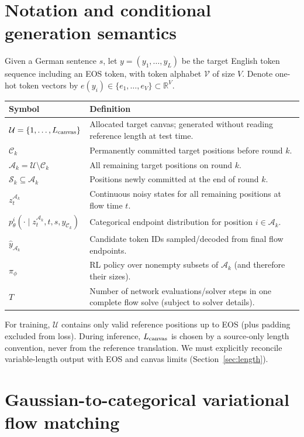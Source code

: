 \documentclass[11pt,a4paper]{article}
\newcommand{\C}{\mathcal C}
\newcommand{\A}{\mathcal A}
\newcommand{\Sset}{\mathcal S}
\newcommand{\V}{\mathcal V}
\begin{document}
\section{Notation and conditional generation semantics}
Given a German sentence $s$, let $y=(y_1,\ldots,y_L)$ be the target English token sequence including an EOS token, with token alphabet $\V$ of size $V$. Denote one-hot token vectors by $e(y_i)\in\{e_1,\ldots,e_V\}\subset\mathbb R^V$.
\begin{center}
\begin{tabularx}{\linewidth}{@{}lX@{}}\toprule
Symbol & Definition \\ \midrule
$\mathcal U=\{1,\dots,L_{\rm canvas}\}$ & Allocated target canvas; generated without reading reference length at test time. \\
$\C_k$ & Permanently committed target positions before round $k$. \\
$\A_k=\mathcal U\setminus\C_k$ & All remaining target positions on round $k$. \\
$\Sset_k\subseteq\A_k$ & Positions newly committed at the end of round $k$. \\
$z_t^{\A_k}$ & Continuous noisy states for all remaining positions at flow time $t$. \\
$p_\theta^i(\cdot\mid z_t^{\A_k},t,s,y_{\C_k})$ & Categorical endpoint distribution for position $i\in\A_k$. \\
$\widehat y_{\A_k}$ & Candidate token IDs sampled/decoded from final flow endpoints. \\
$\pi_\phi$ & RL policy over nonempty subsets of $\A_k$ (and therefore their sizes). \\
$T$ & Number of network evaluations/solver steps in one complete flow solve (subject to solver details). \\
\bottomrule
\end{tabularx}
\end{center}
For training, $\mathcal U$ contains only valid reference positions up to EOS (plus padding excluded from loss). During inference, $L_{\rm canvas}$ is chosen by a source-only length convention, never from the reference translation. We must explicitly reconcile variable-length output with EOS and canvas limits (Section~\ref{sec:length}).

\section{Gaussian-to-categorical variational flow matching}
\end{document}
